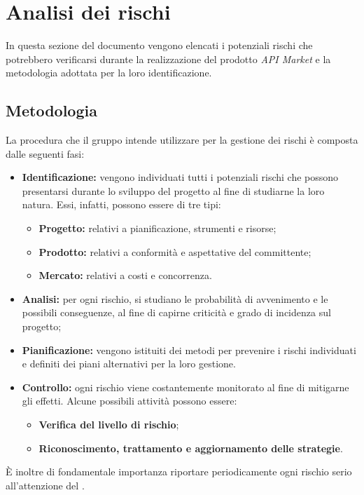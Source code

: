 \newpage
\section{Analisi dei rischi}
In questa sezione del documento vengono elencati i potenziali rischi che potrebbero verificarsi durante la realizzazione del prodotto \textit{API Market} e la metodologia adottata per la loro identificazione.

\subsection{Metodologia}

La procedura che il gruppo \textit{\gruppo} intende utilizzare per la gestione dei rischi è composta dalle seguenti fasi:
\begin{itemize}
	\item \textbf{Identificazione:} vengono individuati tutti i potenziali rischi che possono presentarsi durante lo sviluppo del progetto al fine di studiarne la loro natura. Essi, infatti, possono essere di tre tipi:
	\begin{itemize}
		\item \textbf{Progetto:} relativi a pianificazione, strumenti e risorse;
		\item \textbf{Prodotto:} relativi a conformità e aspettative del committente;
		\item \textbf{Mercato:} relativi a costi e concorrenza.
	\end{itemize}
	\item \textbf{Analisi:} per ogni rischio, si studiano le probabilità di avvenimento e le possibili conseguenze, al fine di capirne criticità e grado di incidenza sul progetto;
	\item \textbf{Pianificazione:} vengono istituiti dei metodi  per prevenire i rischi individuati e definiti dei piani alternativi per la loro gestione.
	\item \textbf{Controllo:} ogni rischio viene costantemente monitorato al fine di mitigarne gli effetti. Alcune possibili attività possono essere:
		\begin{itemize}
		\item \textbf{Verifica del livello di rischio};
		\item \textbf{Riconoscimento, trattamento e aggiornamento delle strategie}.
		\end{itemize}
	\end{itemize}
\MakeUppercase{è} inoltre di fondamentale importanza riportare periodicamente ogni rischio serio all'attenzione del \textit{\RdP}.

